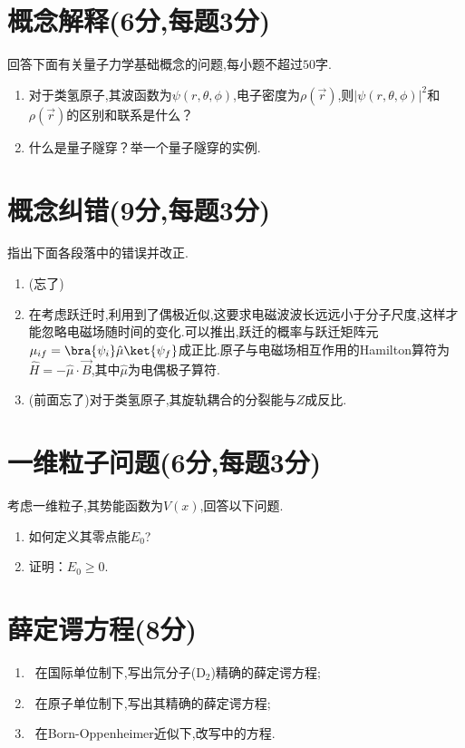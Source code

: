 \documentclass{ctexart}
\begin{document}
\section{概念解释(6分,每题3分)}
回答下面有关量子力学基础概念的问题,每小题不超过$50$字.
\begin{enumerate}[label=\tbf{\arabic*.}]
    \item 对于类氢原子,其波函数为$\psi(r, \theta, \phi)$,电子密度为$\rho(\vec{r})$,则$|\psi(r, \theta, \phi)|^2$和$\rho(\vec{r})$的区别和联系是什么？
    \item 什么是量子隧穿？举一个量子隧穿的实例.
\end{enumerate}
\section{概念纠错(9分,每题3分)}
指出下面各段落中的错误并改正.
\begin{enumerate}[label=\tbf{\arabic*.}]
    \item (忘了)
    \item 在考虑跃迁时,利用到了偶极近似,这要求电磁波波长远远小于分子尺度,这样才能忽略电磁场随时间的变化.可以推出,跃迁的概率与跃迁矩阵元$\mu_{if} = \bra{\psi_i}\hat{\mu}\ket{\psi_f}$成正比.原子与电磁场相互作用的Hamilton算符为$\hat{H} = -\hat{\mu} \cdot \vec{B}$,其中$\hat{\mu}$为电偶极子算符.
    \item (前面忘了)对于类氢原子,其旋轨耦合的分裂能与$Z$成反比.
\end{enumerate}
\section{一维粒子问题(6分,每题3分)}
考虑一维粒子,其势能函数为$V(x)$,回答以下问题.
\begin{enumerate}[label=\tbf{\arabic*.}]
    \item 如何定义其零点能$E_0$?
    \item 证明：$E_0\geq0$.
\end{enumerate}
\section{薛定谔方程(8分)}
\begin{enumerate}[label=\tbf{\arabic*.}]
    \item {}\ 在国际单位制下,写出氘分子(D$_2$)精确的薛定谔方程;
    \item {}\ 在原子单位制下,写出其精确的薛定谔方程;
    \item {}\ 在Born-Oppenheimer近似下,改写中的方程.
\end{enumerate}
\end{document}
